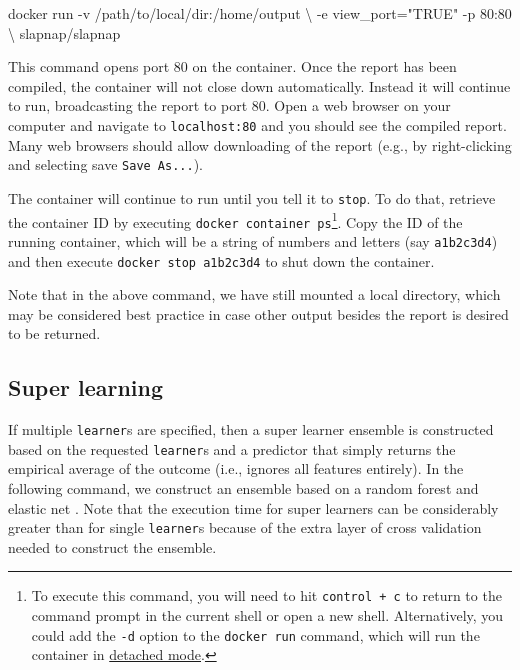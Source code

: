 \documentclass[]{article}
\newenvironment{Shaded}{\begin{snugshade}}{\end{snugshade}}
\newcommand{\StringTok}[1]{\textcolor[rgb]{0.31,0.60,0.02}{#1}}
\newcommand{\ExtensionTok}[1]{#1}
\newcommand{\NormalTok}[1]{#1}
\begin{document}
\begin{Shaded}
\begin{Highlighting}[]
\ExtensionTok{docker}\NormalTok{ run -v /path/to/local/dir:/home/output \textbackslash{}}
\NormalTok{           -e view_port=}\StringTok{"TRUE"}\NormalTok{ -p 80:80 \textbackslash{}}
\NormalTok{           slapnap/slapnap}
\end{Highlighting}
\end{Shaded}

This command opens port 80 on the container. Once the report has been
compiled, the container will not close down automatically. Instead it
will continue to run, broadcasting the report to port 80. Open a web
browser on your computer and navigate to \texttt{localhost:80} and you
should see the compiled report. Many web browsers should allow
downloading of the report (e.g., by right-clicking and selecting save
\texttt{Save\ As...}).

The container will continue to run until you tell it to \texttt{stop}.
To do that, retrieve the container ID by executing
\texttt{docker\ container\ ps}\footnote{To execute this command, you
  will need to hit \texttt{control\ +\ c} to return to the command
  prompt in the current shell or open a new shell. Alternatively, you
  could add the \texttt{-d} option to the \texttt{docker\ run} command,
  which will run the container in
  \href{https://docs.docker.com/engine/reference/run/\#detached-vs-foreground}{detached
  mode}.}. Copy the ID of the running container, which will be a string
of numbers and letters (say \texttt{a1b2c3d4}) and then execute
\texttt{docker\ stop\ a1b2c3d4} to shut down the container.

Note that in the above command, we have still mounted a local directory,
which may be considered best practice in case other output besides the
report is desired to be returned.

\subsection{Super learning}\label{super-learning}

If multiple \texttt{learner}s are specified, then a super learner
ensemble \citep{vanderlaan2007} is constructed based on the requested
\texttt{learner}s and a predictor that simply returns the empirical
average of the outcome (i.e., ignores all features entirely). In the
following command, we construct an ensemble based on a random forest
\citep{breiman2001} and elastic net \citep{zou2005}. Note that the
execution time for super learners can be considerably greater than for
single \texttt{learner}s because of the extra layer of cross validation
needed to construct the ensemble.
\end{document}
